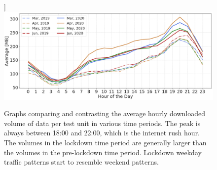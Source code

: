 \begin{figure}[th]
    \label{download-e}]{%
        \includegraphics[width=0.48\linewidth]{figs/wenjun/download_wdays_compare_36.png}%
    }
    \hfil

    \caption{Graphs comparing and contrasting the average hourly downloaded volume of data per test unit in various time periods. The peak is always between 18:00 and 22:00, which is the internet rush hour. The volumes in the lockdown time period are generally larger than the volumes in the pre-lockdown time period. Lockdown weekday traffic patterns start to resemble weekend patterns.}
    \label{fig:download-data-per-user-hours-fig}
\end{figure}

